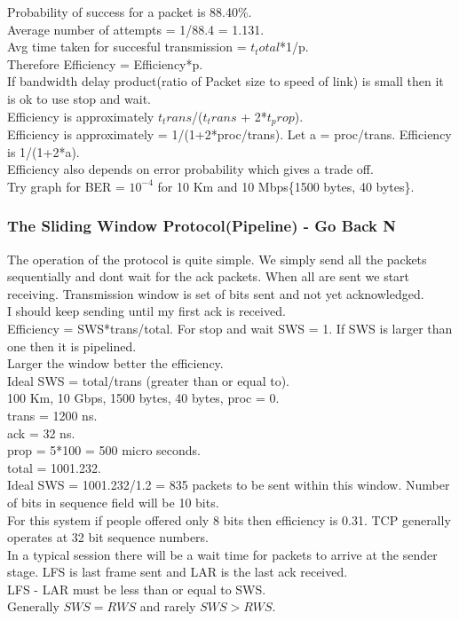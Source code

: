 \documentclass[solution,addpoints,12pt]{exam}
\begin{document}
Probability of success for a packet is 88.40\%.\\
Average number of attempts = 1/88.4 = 1.131.\\
Avg time taken for succesful transmission = $t_total$*1/p.\\
Therefore Efficiency = Efficiency*p.\\
If bandwidth delay product(ratio of Packet size to speed of link) is
small then it is ok to use stop and wait.\\
Efficiency is approximately  $t_trans$/($t_trans$ + 2*$t_prop$).\\
Efficiency is approximately = 1/(1+2*proc/trans).
Let a = proc/trans. Efficiency is 1/(1+2*a).\\
Efficiency also depends on error probability which gives a trade off.\\
Try graph for BER = $10^{-4}$ for 10 Km and 10 Mbps\{1500 bytes, 40 bytes\}.
\subsubsection{The Sliding Window Protocol(Pipeline) - Go Back N}
The operation of the protocol is quite simple. We simply send all the packets
sequentially and dont wait for the ack packets. When all are sent we start
receiving. Transmission window is set of bits sent and not yet acknowledged.\\
I should keep sending until my first ack is received.\\
Efficiency = SWS*trans/total. For stop and wait SWS = 1.
If SWS is larger than one then it is pipelined.\\
Larger the window better the efficiency.\\
Ideal SWS = total/trans (greater than or equal to).\\
100 Km, 10 Gbps, 1500 bytes, 40 bytes, proc = 0.\\
trans = 1200 ns.\\
ack = 32 ns.\\
prop = 5*100 = 500 micro seconds.\\
total = 1001.232.\\
Ideal SWS = 1001.232/1.2 = 835 packets to be sent within this window.
Number of bits in sequence field will be 10 bits.\\
For this system if people offered only 8 bits then efficiency is 0.31.
TCP generally operates at 32 bit sequence numbers.\\
In a typical session there will be a wait time for packets to arrive
at the sender stage.
LFS is last frame sent and LAR is the last ack received.\\
LFS - LAR must be less than or equal to SWS.\\
Generally $SWS = RWS$ and rarely $SWS > RWS$.
\end{document}
